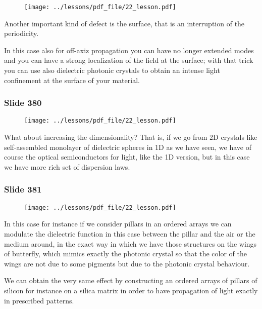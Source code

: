 \documentclass[../main/main.tex]{subfiles}
\begin{document}
\begin{figure}[h!]
\centering
\texttt{[image: ../lessons/pdf\_file/22\_lesson.pdf]}
\end{figure}

Another important kind of defect is the surface, that is an interruption of the periodicity. 

In this case also for off-axiz propagation you can have no longer extended modes and you can have a strong localization of the field at the surface; with that trick you can use also dielectric photonic crystals to obtain an intense light confinement at the surface of your material. 

\newpage

\subsubsection{Slide 380}

\begin{figure}[h!]
\centering
\texttt{[image: ../lessons/pdf\_file/22\_lesson.pdf]}
\end{figure}

What about increasing the dimensionality? That is, if we go from 2D crystals like self-assembled monolayer of dielectric spheres in 1D as we have seen, we have of course the optical semiconductors for light, like the 1D version, but in this case we have more rich set of dispersion laws.

\newpage

\subsubsection{Slide 381}

\begin{figure}[h!]
\centering
\texttt{[image: ../lessons/pdf\_file/22\_lesson.pdf]}
\end{figure}

In this case for instance if we consider pillars in an ordered  arrays we can modulate the dielectric function in this case between the pillar and the air or the medium around, in the exact way in which we have those structures on the wings of butterfly, which mimics exactly the photonic crystal so that the color of the wings are not due to some pigments but due to the photonic crystal behaviour. 

We can obtain the very same effect by constructing an ordered arrays of pillars of silicon for instance on a silica matrix in order to have propagation of light exactly in prescribed patterns. 
\end{document}

